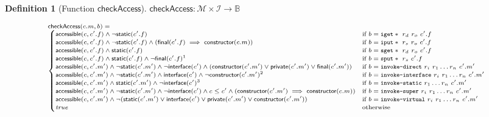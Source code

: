\documentclass[english,dvips,ps2pdf,11pt]{article}
\theoremstyle{definition}
\newtheorem{definition}{Definition}[section]
\newcommand{\todo}[1]{\footnote{\textcolor{red}{#1}}}
\newcommand{\var}[1]{\ensuremath{\mathit{#1}}\xspace}
\newcommand{\func}[1]{\ensuremath{\mathsf{#1}}\xspace}
\newcommand{\bcode}[1]{\texttt{#1}\xspace}
\newcommand{\methods}[0]{\ensuremath{\mathcal{M}}\xspace}
\newcommand{\instructions}[0]{\ensuremath{\mathcal{I}}\xspace}
\newcommand{\inherits}[0]{\ensuremath{\leq}\xspace}
\newcommand{\static}[0]{\func{static}}
\newcommand{\constructor}[0]{\func{constructor}}
\newcommand{\final}[0]{\func{final}}
\newcommand{\private}[0]{\func{private}}
\newcommand{\interface}[0]{\func{interface}}
\newcommand{\accessible}[0]{\func{accessible}}
\newcommand{\checkaccess}[0]{\func{checkAccess}}
\begin{document}
\begin{definition}[Function \checkaccess]
  $\checkaccess : \methods \times \instructions  \longrightarrow \mathbb{B}$

  \[\scriptsize
  \begin{array}{l}
    \checkaccess(c.m, b) =\\
    \begin{cases}
      \accessible(c, c'.f) \wedge \neg\static(c'.f) & \text{if $b = \bcode{iget}*\ r_d\ r_o\ c'.f$}\\
      \accessible(c, c'.f) \wedge \neg\static(c'.f) \wedge (\final(c'.f) \implies \constructor(c.m)) & \text{if $b = \bcode{iput}*\ r_s\ r_o\ c'.f$}\\
      \accessible(c, c'.f) \wedge \static(c'.f) & \text{if $b = \bcode{sget}*\ r_d\ r_o\ c'.f$}\\
      \accessible(c, c'.f) \wedge \static(c'.f) \wedge \neg\final(c'.f)\todo{euh, comment ils sont initialisés ? comme en java classique ?} & \text{if $b = \bcode{sput}*\ r_s\ c'.f$}\\
      \accessible(c, c'.m') \wedge \neg\static(c'.m') \wedge \neg\interface(c') \wedge (\constructor(c'.m') \vee \private(c'.m') \vee \final(c'.m')) & \text{if $b = \bcode{invoke-direct}\ r_i\ r_1 \dots r_n\ c'.m'$}\\
      \accessible(c, c'.m') \wedge \neg\static(c'.m') \wedge \interface(c') \wedge \neg\constructor(c'.m')\todo{on pourrait ajouter $\neg(\constructor(c'.m') \vee \private(c'.m') \vee \final(c'.m'))$ mais normalement c'est inutile car on aura vérifié l'interface $c'$ ne définit pas de private et/ou de final et/ou de constructeur} & \text{if $b = \bcode{invoke-interface}\ r_i\ r_1 \dots r_n\ c'.m'$}\\
      \accessible(c, c'.m') \wedge \static(c'.m') \wedge \neg\interface(c')\todo{on aura vérifié qu'une méthode static n'est pas un constructeur, ou pas ???} & \text{if $b = \bcode{invoke-static}\ r_1 \dots r_n\ c'.m'$}\\
      \accessible(c, c'.m') \wedge \neg\static(c'.m') \wedge \neg\interface(c')  \wedge c \inherits c' \wedge (\constructor(c'.m') \implies \constructor(c.m)) & \text{if $b = \bcode{invoke-super}\ r_i\ r_1 \dots r_n\ c'.m'$}\\
      \accessible(c, c'.m') \wedge \neg(\static(c'.m') \vee \interface(c') \vee \private(c'.m') \vee \constructor(c'.m')) &\text{if $b =  \bcode{invoke-virtual}\ r_i\ r_1 \dots r_n\ c'.m'$}\\
      \var{true} & \text{otherwise}\\
    \end{cases}\\
  \end{array}
  \]
  
\end{definition}
\end{document}
